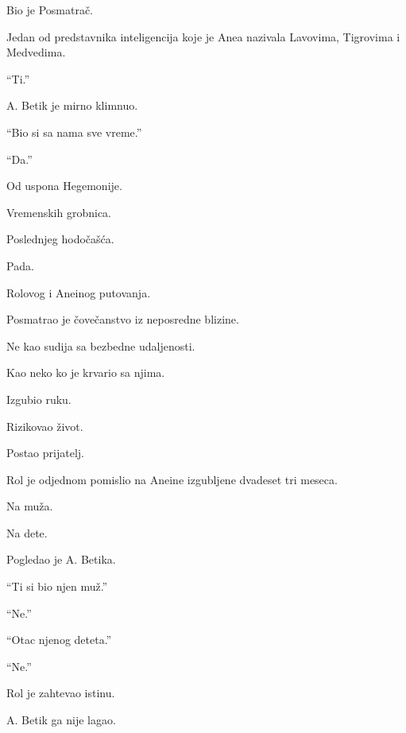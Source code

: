 Bio je Posmatrač.

\bigskip

Jedan od predstavnika inteligencija koje je Anea nazivala Lavovima, Tigrovima i Medvedima.

\bigskip

``Ti.''

\bigskip

A. Betik je mirno klimnuo.

\bigskip

``Bio si sa nama sve vreme.''

``Da.''

\bigskip

Od uspona Hegemonije.

Vremenskih grobnica.

Poslednjeg hodočašća.

Pada.

Rolovog i Aneinog putovanja.

\bigskip

Posmatrao je čovečanstvo iz neposredne blizine.

\bigskip

Ne kao sudija sa bezbedne udaljenosti.

\bigskip

Kao neko ko je krvario sa njima.

Izgubio ruku.

Rizikovao život.

Postao prijatelj.

\bigskip

Rol je odjednom pomislio na Aneine izgubljene dvadeset tri meseca.

\bigskip

Na muža.

Na dete.

\bigskip

Pogledao je A. Betika.

\bigskip

``Ti si bio njen muž.''

\bigskip

``Ne.''

\bigskip

``Otac njenog deteta.''

``Ne.''

\bigskip

Rol je zahtevao istinu.

\bigskip

A. Betik ga nije lagao.

\bigskip

